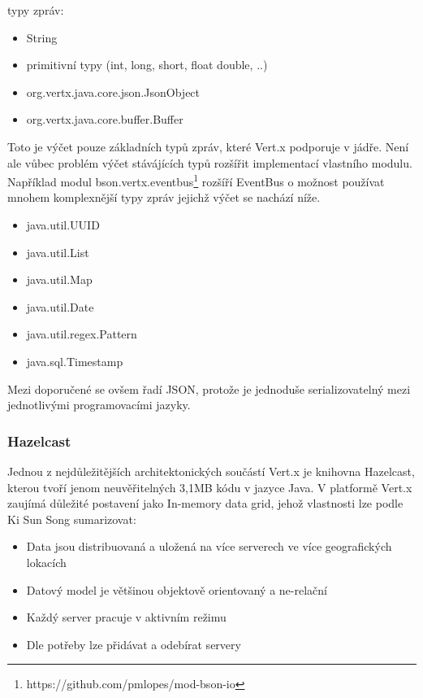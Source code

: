 typy zpráv:
\begin{itemize}
\item{String}
\item{primitivní typy (int, long, short, float double, ..)}
\item{org.vertx.java.core.json.JsonObject}
\item{org.vertx.java.core.buffer.Buffer}
\end{itemize}

Toto je výčet pouze základních typů zpráv, které Vert.x podporuje v jádře. Není ale vůbec problém výčet stávájících typů rozšířit implementací vlastního modulu. Například modul bson.vertx.eventbus\footnote{https://github.com/pmlopes/mod-bson-io} rozšíří EventBus o možnost používat mnohem komplexnější typy zpráv jejichž výčet se nachází níže.

\begin{itemize}
\item{java.util.UUID}	
\item{java.util.List}
\item{java.util.Map}
\item{java.util.Date}
\item{java.util.regex.Pattern}
\item{java.sql.Timestamp}
\end{itemize}

Mezi doporučené se ovšem řadí JSON, protože je jednoduše serializovatelný mezi jednotlivými programovacími jazyky.

\subsubsection{Hazelcast}\label{sub:hazelcast}

Jednou z nejdůležitějších architektonických součástí Vert.x je knihovna Hazelcast, kterou tvoří jenom neuvěřitelných 3,1MB kódu v jazyce Java. V platformě Vert.x zaujímá důležité postavení jako In-memory data grid, jehož vlastnosti \cite{inMemoryDataGrid} lze podle Ki Sun Song sumarizovat:
\begin{itemize}
\item{Data jsou distribuovaná a uložená na více serverech ve více geografických lokacích}
\item{Datový model je většinou objektově orientovaný a ne-relační}
\item{Každý server pracuje v aktivním režimu}
\item{Dle potřeby lze přidávat a odebírat servery}
\end{itemize}

